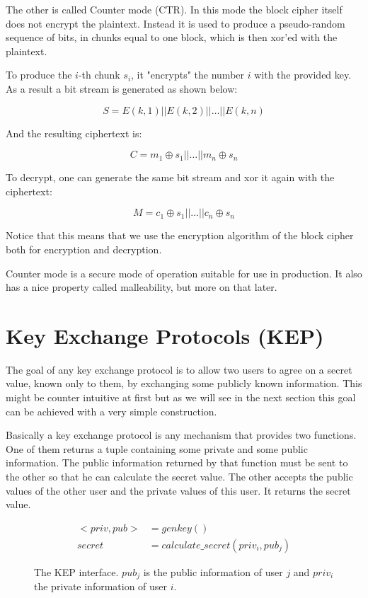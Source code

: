 The other is called Counter mode (CTR).
In this mode the block cipher itself does not encrypt the plaintext.
Instead it is used to produce a pseudo-random sequence of bits, in chunks equal to one block, which is then xor'ed with the plaintext.

To produce the $i$-th chunk $s_i$, it "encrypts" the number $i$ with the provided key.
As a result a bit stream is generated as shown below:

\[
  S = E(k, 1) || E(k, 2) || \dots || E(k, n)
\]

And the resulting ciphertext is:

\[
  C = m_1 \oplus s_1 || \dots || m_n \oplus s_n
\]

To decrypt, one can generate the same bit stream and xor it again with the ciphertext:

\[
  M = c_1 \oplus s_1 || \dots || c_n \oplus s_n
\]

Notice that this means that we use the encryption algorithm of the block cipher both for encryption and decryption.

Counter mode is a secure mode of operation suitable for use in production.
It also has a nice property called malleability, but more on that later.

\section{Key Exchange Protocols (KEP)}

The goal of any key exchange protocol is to allow two users to agree on a secret value, known only to them, by exchanging some publicly known information.
This might be counter intuitive at first but as we will see in the next section this goal can be achieved with a very simple construction.

Basically a key exchange protocol is any mechanism that provides two functions.
One of them returns a tuple containing some private and some public information.
The public information returned by that function must be sent to the other so that he can calculate the secret value.
The other accepts the public values of the other user and the private values of this user.
It returns the secret value.

\begin{figure}[H]
  \begin{align*}
    <priv, pub> &= genkey() \\
    secret &= calculate\_secret(priv_i, pub_j)
  \end{align*}
  \caption[The interface of a Key Exchange Protocol]{The KEP interface. $pub_j$ is the public information of user $j$ and $priv_i$ the private information of user $i$.}
\end{figure}

